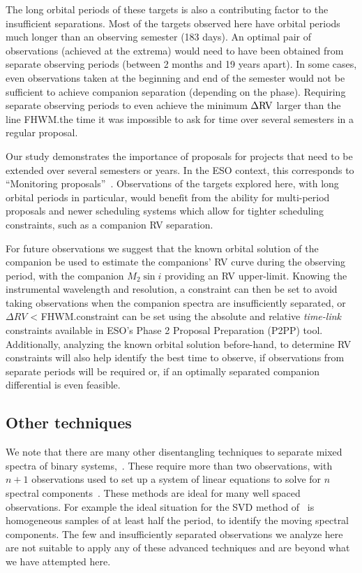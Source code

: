 \documentclass[fleqn,usenatbib]{mnras}
\begin{document}
The long orbital periods of these targets is also a contributing factor to the insufficient separations. Most of the targets observed here have orbital periods much longer than an observing semester (183 days). An optimal pair of observations (achieved at the extrema) would need to have been obtained from separate observing periods (between 2 months and 19 years apart). In some cases, even observations taken at the beginning and end of the semester would not be sufficient to achieve companion separation (depending on the phase). Requiring separate observing periods to even achieve the minimum \(\Delta \rm RV\) larger than the line FHWM.\@At the time it was impossible to ask for time over several semesters in a regular proposal.

Our study demonstrates the importance of proposals for projects that need to be extended over several semesters or years. In the ESO context, this corresponds to ``Monitoring proposals''~\citep[e.g.][pg. 18]{eso_eso_2017}. Observations of the targets explored here, with long orbital periods in particular, would benefit from the ability for multi-period proposals and newer scheduling systems which allow for tighter scheduling constraints, such as a companion RV separation. 

For future observations we suggest that the known orbital solution of the companion be used to estimate the companions' RV curve during the observing period, with the companion \(M_2\sin{i}\) providing an RV upper-limit. Knowing the instrumental wavelength and resolution, a constraint can then be set to avoid taking observations when the companion spectra are insufficiently separated, or \(\Delta RV\) < FHWM.\@This constraint can be set using the absolute and relative \emph{time-link} constraints available in ESO's Phase 2 Proposal Preparation (P2PP) tool.
Additionally, analyzing the known orbital solution before-hand, to determine RV constraints will also help identify the best time to observe, if observations from separate periods will be required or, if an optimally separated companion differential is even feasible.

\subsection{Other techniques}
We note that there are many other disentangling techniques to separate mixed spectra of binary systems,~\citep[e.g.][]{hadrava_disentangling_2009}. These require more than two observations, with  \(n+1 \) observations used to set up a system of linear equations to solve for \(n \) spectral components~\citep[e.g.][]{simon_disentangling_1994,czekala_disentangling_2017, sablowski_spectral_2016}. These methods are ideal for many well spaced observations. For example the ideal situation for the SVD method of~\citet{sablowski_spectral_2016} is homogeneous samples of at least half the period, to identify the moving spectral components. The few and insufficiently separated observations we analyze here are not suitable to apply any of these advanced techniques and are beyond what we have attempted here.
\end{document}
